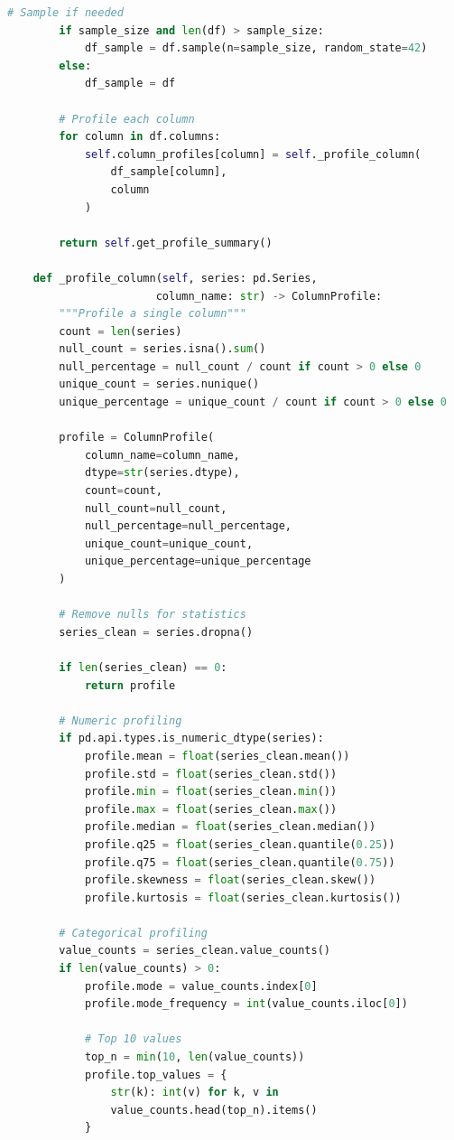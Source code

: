 \begin{lstlisting}[language=Python, caption=Comprehensive Data Profiling Framework]
        # Sample if needed
        if sample_size and len(df) > sample_size:
            df_sample = df.sample(n=sample_size, random_state=42)
        else:
            df_sample = df

        # Profile each column
        for column in df.columns:
            self.column_profiles[column] = self._profile_column(
                df_sample[column],
                column
            )

        return self.get_profile_summary()

    def _profile_column(self, series: pd.Series,
                       column_name: str) -> ColumnProfile:
        """Profile a single column"""
        count = len(series)
        null_count = series.isna().sum()
        null_percentage = null_count / count if count > 0 else 0
        unique_count = series.nunique()
        unique_percentage = unique_count / count if count > 0 else 0

        profile = ColumnProfile(
            column_name=column_name,
            dtype=str(series.dtype),
            count=count,
            null_count=null_count,
            null_percentage=null_percentage,
            unique_count=unique_count,
            unique_percentage=unique_percentage
        )

        # Remove nulls for statistics
        series_clean = series.dropna()

        if len(series_clean) == 0:
            return profile

        # Numeric profiling
        if pd.api.types.is_numeric_dtype(series):
            profile.mean = float(series_clean.mean())
            profile.std = float(series_clean.std())
            profile.min = float(series_clean.min())
            profile.max = float(series_clean.max())
            profile.median = float(series_clean.median())
            profile.q25 = float(series_clean.quantile(0.25))
            profile.q75 = float(series_clean.quantile(0.75))
            profile.skewness = float(series_clean.skew())
            profile.kurtosis = float(series_clean.kurtosis())

        # Categorical profiling
        value_counts = series_clean.value_counts()
        if len(value_counts) > 0:
            profile.mode = value_counts.index[0]
            profile.mode_frequency = int(value_counts.iloc[0])

            # Top 10 values
            top_n = min(10, len(value_counts))
            profile.top_values = {
                str(k): int(v) for k, v in
                value_counts.head(top_n).items()
            }


\end{lstlisting}

